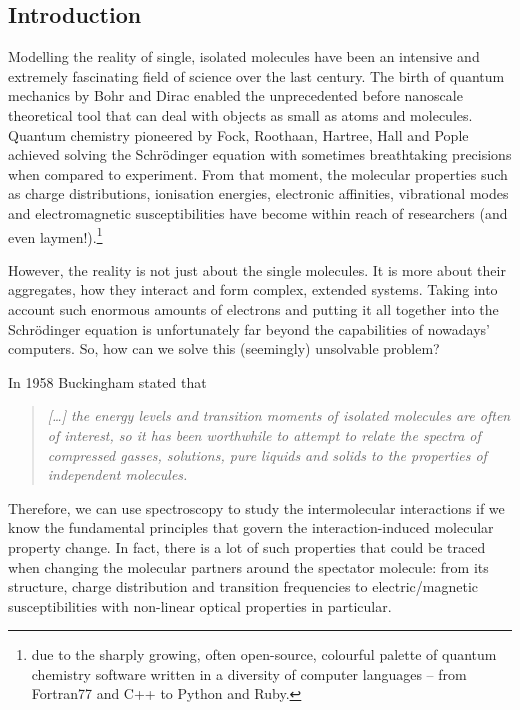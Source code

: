 \documentclass[a4paper,titlepage,twoside,fleqn,12pt]{book}
\begin{document}

\begin{refsection}
    \fancyhead[RE,LO]{\rightmark}
\chapter{Introduction}

Modelling the reality of single, isolated molecules have been 
an intensive and extremely fascinating field of science over the
last century. The birth of quantum mechanics by Bohr and Dirac enabled the unprecedented
before nanoscale theoretical tool that can deal with objects as small
as atoms and molecules. Quantum chemistry pioneered by Fock, Roothaan, Hartree, Hall
and Pople achieved solving the Schr{\"o}dinger
equation with sometimes breathtaking precisions when compared to experiment.
From that moment, the molecular properties such as charge distributions, ionisation energies,
electronic affinities, vibrational modes and electromagnetic susceptibilities
have become within reach of researchers (and even laymen!).\footnote{due to the
sharply growing, often open-source, colourful palette of quantum chemistry software
written in a diversity of computer languages -- from Fortran77 and C++ to Python and Ruby.} 

However, the reality is not just about the single molecules. It is more about their aggregates,
how they interact and form complex, extended systems. Taking into account such enormous
amounts of electrons and putting it all together into the Schr{\"o}dinger equation 
is unfortunately far beyond the capabilities of nowadays' computers. So, how can we solve this 
(seemingly) unsolvable problem? 

In 1958 Buckingham stated \citep{Buckingham.ProcRSocLondonA.1958} that
%
\begin{quote}
\emph{
[\ldots] the energy levels and transition moments of isolated molecules are often 
of interest, so it has been worthwhile to attempt to relate the spectra of compressed
gasses, solutions, pure liquids and solids to the properties of independent molecules.
}
\end{quote}
%
Therefore, we can use spectroscopy to study the intermolecular interactions
if we know the fundamental principles that govern the interaction-induced molecular property
change. In fact, there is a lot of such properties that could be traced when changing
the molecular partners around the spectator molecule: from its
structure, charge distribution and transition frequencies to electric\slash{}magnetic 
susceptibilities with non\hyp{}linear optical properties in particular.


\end{refsection}
\end{document}
